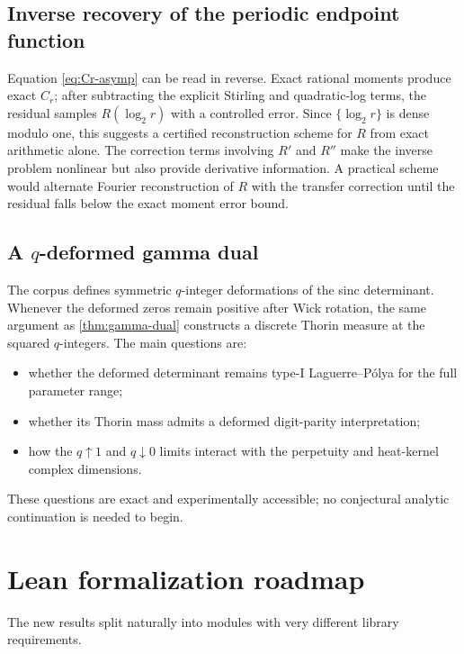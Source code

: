\documentclass[11pt,oneside]{article}
\theoremstyle{definition}
\theoremstyle{remark}
\begin{document}
\subsection{Inverse recovery of the periodic endpoint function}

Equation \cref{eq:Cr-asymp} can be read in reverse.  Exact rational moments
produce exact $C_r$; after subtracting the explicit Stirling and quadratic-log
terms, the residual samples $R(\log_2r)$ with a controlled error.  Since
$\{\log_2r\}$ is dense modulo one, this suggests a certified reconstruction
scheme for $R$ from exact arithmetic alone.  The correction terms involving
$R'$ and $R''$ make the inverse problem nonlinear but also provide derivative
information.  A practical scheme would alternate Fourier reconstruction of
$R$ with the transfer correction until the residual falls below the exact
moment error bound.

\subsection{A $q$-deformed gamma dual}

The corpus defines symmetric $q$-integer deformations of the sinc determinant.
Whenever the deformed zeros remain positive after Wick rotation, the same
argument as \cref{thm:gamma-dual} constructs a discrete Thorin measure at the
squared $q$-integers.  The main questions are:
\begin{itemize}
\item whether the deformed determinant remains type-I Laguerre--P\'olya for the
      full parameter range;
\item whether its Thorin mass admits a deformed digit-parity interpretation;
\item how the $q\uparrow1$ and $q\downarrow0$ limits interact with the
      perpetuity and heat-kernel complex dimensions.
\end{itemize}
These questions are exact and experimentally accessible; no conjectural
analytic continuation is needed to begin.

\section{Lean formalization roadmap}

The new results split naturally into modules with very different library
requirements.
\end{document}
